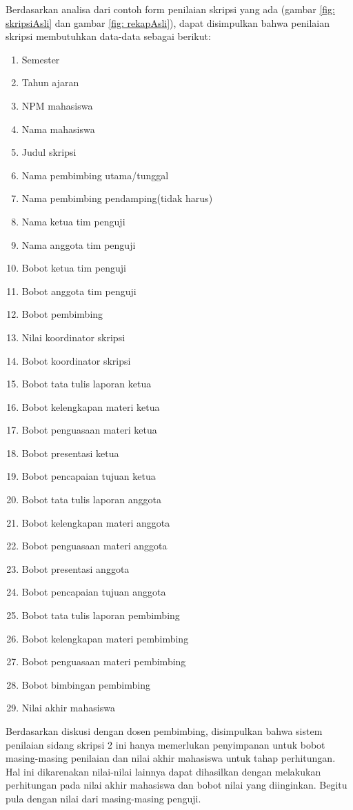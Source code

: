 	Berdasarkan analisa dari contoh form penilaian skripsi yang ada (gambar \ref{fig: skripsiAsli} dan gambar \ref{fig: rekapAsli}), dapat disimpulkan bahwa penilaian skripsi membutuhkan data-data sebagai berikut:
		
		\begin{enumerate}
			\item Semester
			\item Tahun ajaran
			\item NPM mahasiswa 
			\item Nama mahasiswa
			\item Judul skripsi
			\item Nama pembimbing utama/tunggal
			\item Nama pembimbing pendamping(tidak harus)
			\item Nama ketua tim penguji
			\item Nama anggota tim penguji
			\item Bobot ketua tim penguji
			\item Bobot anggota tim penguji
			\item Bobot pembimbing
			\item Nilai koordinator skripsi
			\item Bobot koordinator skripsi
			\item Bobot tata tulis laporan ketua
			\item Bobot kelengkapan materi ketua
			\item Bobot penguasaan materi ketua
			\item Bobot presentasi ketua
			\item Bobot pencapaian tujuan ketua
			\item Bobot tata tulis laporan anggota
			\item Bobot kelengkapan materi anggota
			\item Bobot penguasaan materi anggota
			\item Bobot presentasi anggota
			\item Bobot pencapaian tujuan anggota
			\item Bobot tata tulis laporan pembimbing
			\item Bobot kelengkapan materi pembimbing
			\item Bobot penguasaan materi pembimbing
			\item Bobot bimbingan pembimbing
			\item Nilai akhir mahasiswa
		\end{enumerate}
	
	Berdasarkan diskusi dengan dosen pembimbing, disimpulkan bahwa sistem penilaian sidang skripsi 2 ini hanya memerlukan penyimpanan untuk bobot masing-masing penilaian dan nilai akhir mahasiswa untuk tahap perhitungan. Hal ini dikarenakan nilai-nilai lainnya dapat dihasilkan dengan melakukan perhitungan pada  nilai akhir mahasiswa dan bobot nilai yang diinginkan. Begitu pula dengan nilai dari masing-masing penguji.
	
